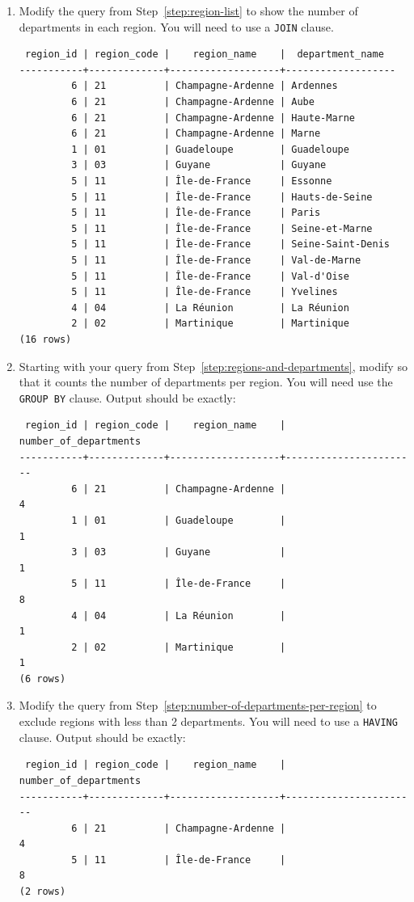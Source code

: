 \documentclass{pgnotes}
\begin{document}
\begin{enumerate}
\item Modify the query from Step~\ref{step:region-list} to show the number of departments in each region.
  You will need to use a \texttt{JOIN} clause.
\begin{verbatim}
 region_id | region_code |    region_name    |  department_name
-----------+-------------+-------------------+-------------------
         6 | 21          | Champagne-Ardenne | Ardennes
         6 | 21          | Champagne-Ardenne | Aube
         6 | 21          | Champagne-Ardenne | Haute-Marne
         6 | 21          | Champagne-Ardenne | Marne
         1 | 01          | Guadeloupe        | Guadeloupe
         3 | 03          | Guyane            | Guyane
         5 | 11          | Île-de-France     | Essonne
         5 | 11          | Île-de-France     | Hauts-de-Seine
         5 | 11          | Île-de-France     | Paris
         5 | 11          | Île-de-France     | Seine-et-Marne
         5 | 11          | Île-de-France     | Seine-Saint-Denis
         5 | 11          | Île-de-France     | Val-de-Marne
         5 | 11          | Île-de-France     | Val-d'Oise
         5 | 11          | Île-de-France     | Yvelines
         4 | 04          | La Réunion        | La Réunion
         2 | 02          | Martinique        | Martinique
(16 rows)
\end{verbatim}
\label{step:regions-and-departments}
  
\item
  Starting with your query from Step~\ref{step:regions-and-departments}, modify so that it counts the number of departments per region.
  You will need use the \texttt{GROUP BY} clause.
  Output should be exactly:
\begin{verbatim}
 region_id | region_code |    region_name    | number_of_departments
-----------+-------------+-------------------+-----------------------
         6 | 21          | Champagne-Ardenne |                     4
         1 | 01          | Guadeloupe        |                     1
         3 | 03          | Guyane            |                     1
         5 | 11          | Île-de-France     |                     8
         4 | 04          | La Réunion        |                     1
         2 | 02          | Martinique        |                     1
(6 rows)
\end{verbatim}
\label{step:number-of-departments-per-region}

\item
  Modify the query from Step~\ref{step:number-of-departments-per-region} to exclude regions with less than 2 departments.
  You will need to use a \texttt{HAVING} clause.
  Output should be exactly:
\begin{verbatim}
 region_id | region_code |    region_name    | number_of_departments
-----------+-------------+-------------------+-----------------------
         6 | 21          | Champagne-Ardenne |                     4
         5 | 11          | Île-de-France     |                     8
(2 rows)
\end{verbatim}
\label{step:number-of-departments-per-region-not-1}


\end{enumerate}
\end{document}
